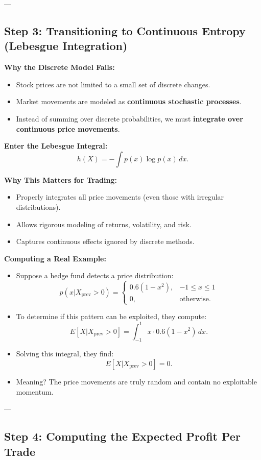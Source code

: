 ---

\subsection{Step 3: Transitioning to Continuous Entropy (Lebesgue Integration)}

\textbf{Why the Discrete Model Fails:}
\begin{itemize}
    \item Stock prices are not limited to a small set of discrete changes.
    \item Market movements are modeled as \textbf{continuous stochastic processes}.
    \item Instead of summing over discrete probabilities, we must \textbf{integrate over continuous price movements}.
\end{itemize}

\textbf{Enter the Lebesgue Integral:}
\[
h(X) = -\int p(x) \log p(x) \, dx.
\]

\textbf{Why This Matters for Trading:}
\begin{itemize}
    \item Properly integrates all price movements (even those with irregular distributions).
    \item Allows rigorous modeling of returns, volatility, and risk.
    \item Captures continuous effects ignored by discrete methods.
\end{itemize}

\textbf{Computing a Real Example:}
\begin{itemize}
    \item Suppose a hedge fund detects a price distribution:
\[
p(x | X_{\text{prev}} > 0) =
\begin{cases} 
    0.6(1 - x^2), & -1 \leq x \leq 1 \\
    0, & \text{otherwise}.
\end{cases}
\]
\item To determine if this pattern can be exploited, they compute:
\[
E[X | X_{\text{prev}} > 0] = \int_{-1}^{1} x \cdot 0.6 (1 - x^2) \, dx.
\]
\item Solving this integral, they find:
\[
E[X | X_{\text{prev}} > 0] = 0.
\]
\item Meaning? The price movements are truly random and contain no exploitable momentum.
\end{itemize}

---

\subsection{Step 4: Computing the Expected Profit Per Trade}


